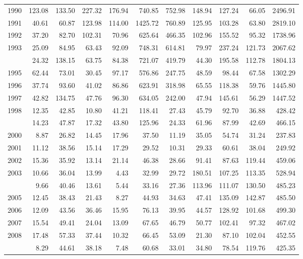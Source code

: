 \begin{longtable}[t]{rrrrrrrrrrr}
1990 & 123.08 & 133.50 & 227.32 & 176.94 & 740.85 & 752.98 & 148.94 & 127.24 & 66.05 & 2496.91\\
1991 & 40.61 & 60.87 & 123.98 & 114.00 & 1425.72 & 760.89 & 125.95 & 103.28 & 63.80 & 2819.10\\
1992 & 37.20 & 82.70 & 102.31 & 70.96 & 625.64 & 466.35 & 102.96 & 155.52 & 95.32 & 1738.96\\
1993 & 25.09 & 84.95 & 63.43 & 92.09 & 748.31 & 614.81 & 79.97 & 237.24 & 121.73 & 2067.62\\
\addlinespace
1994 & 24.32 & 138.15 & 63.75 & 84.38 & 721.07 & 419.79 & 44.30 & 195.58 & 112.78 & 1804.13\\
1995 & 62.44 & 73.01 & 30.45 & 97.17 & 576.86 & 247.75 & 48.59 & 98.44 & 67.58 & 1302.29\\
1996 & 37.74 & 93.60 & 41.02 & 86.86 & 623.91 & 318.98 & 65.55 & 118.38 & 59.76 & 1445.80\\
1997 & 42.82 & 134.75 & 47.76 & 96.30 & 634.05 & 242.00 & 47.94 & 145.61 & 56.29 & 1447.52\\
1998 & 12.35 & 42.85 & 10.80 & 41.21 & 118.41 & 27.43 & 45.79 & 92.70 & 36.88 & 428.42\\
\addlinespace
1999 & 14.23 & 47.87 & 17.32 & 43.80 & 125.96 & 24.33 & 61.96 & 87.99 & 42.69 & 466.15\\
2000 & 8.87 & 26.82 & 14.45 & 17.96 & 37.50 & 11.19 & 35.05 & 54.74 & 31.24 & 237.83\\
2001 & 11.12 & 38.56 & 15.14 & 17.29 & 29.52 & 10.31 & 29.33 & 60.61 & 38.04 & 249.92\\
2002 & 15.36 & 35.92 & 13.14 & 21.14 & 46.38 & 28.66 & 91.41 & 87.63 & 119.44 & 459.06\\
2003 & 10.66 & 36.04 & 13.99 & 4.43 & 32.99 & 29.72 & 180.51 & 107.25 & 113.35 & 528.94\\
\addlinespace
2004 & 9.66 & 40.46 & 13.61 & 5.44 & 33.16 & 27.36 & 113.96 & 111.07 & 130.50 & 485.23\\
2005 & 12.45 & 38.43 & 21.43 & 8.27 & 44.93 & 34.63 & 47.41 & 135.09 & 142.87 & 485.50\\
2006 & 12.09 & 43.56 & 36.46 & 15.95 & 76.13 & 39.95 & 44.57 & 128.92 & 101.68 & 499.30\\
2007 & 15.54 & 49.41 & 24.04 & 13.09 & 67.65 & 46.79 & 50.77 & 102.41 & 97.32 & 467.02\\
2008 & 17.48 & 57.33 & 37.44 & 10.32 & 66.45 & 53.09 & 21.30 & 87.10 & 102.04 & 452.55\\
\addlinespace
2009 & 8.29 & 44.61 & 38.18 & 7.48 & 60.68 & 33.01 & 34.80 & 78.54 & 119.76 & 425.35\\

\end{longtable}
